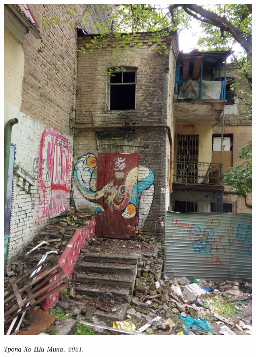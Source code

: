 \begin{center}
\includegraphics[width=\linewidth]{rpix/IMG_20210601_135245.jpg}

\textit{Тропа Хо Ши Мина. 2021.}
\end{center}

\newpage

\vspace*{\fill}


